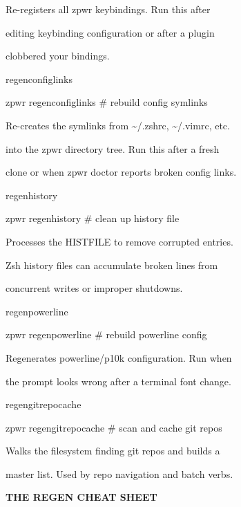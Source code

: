 \documentclass[11pt,a4paper,twoside]{book}
\begin{document}
Re-registers all zpwr keybindings. Run this after

editing keybinding configuration or after a plugin

clobbered your bindings.

regenconfiglinks

\begin{codebox}
zpwr regenconfiglinks               \# rebuild config symlinks\\
\end{codebox}

Re-creates the symlinks from \textasciitilde{}/.zshrc, \textasciitilde{}/.vimrc, etc.

into the zpwr directory tree. Run this after a fresh

clone or when zpwr doctor reports broken config links.

regenhistory

\begin{codebox}
zpwr regenhistory                   \# clean up history file\\
\end{codebox}

Processes the HISTFILE to remove corrupted entries.

Zsh history files can accumulate broken lines from

concurrent writes or improper shutdowns.

regenpowerline

\begin{codebox}
zpwr regenpowerline                 \# rebuild powerline config\\
\end{codebox}

Regenerates powerline/p10k configuration. Run when

the prompt looks wrong after a terminal font change.

regengitrepocache

\begin{codebox}
zpwr regengitrepocache              \# scan and cache git repos\\
\end{codebox}

Walks the filesystem finding git repos and builds a

master list. Used by repo navigation and batch verbs.


\vspace{12pt}
{\bfseries\color{neonyellow} THE REGEN CHEAT SHEET}\vspace{4pt}
\end{document}
